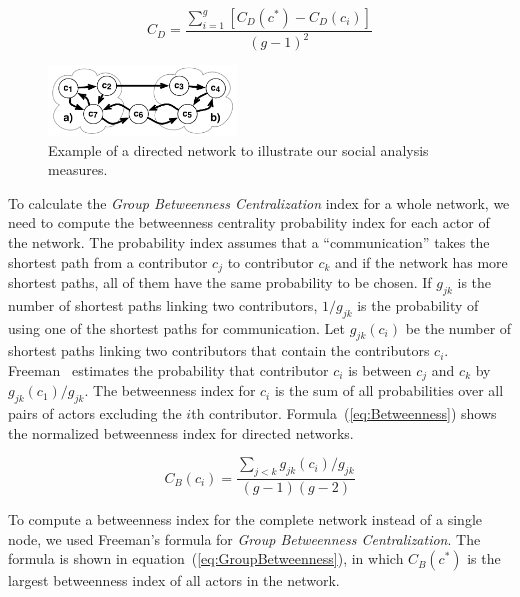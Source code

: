 \documentclass[12pt,oneside]{book}
\begin{document}
\begin{equation}
\displaystyle C_D =  \frac{\sum_{i=1}^g[C_D(c^*) - C_D(c_i)]}{(g-1)^2}
\label{eq:GroupDegreeCentralization}
\end{equation}

\begin{figure}[t]
\begin{center}
\includegraphics[width=5.0cm]{figures/CentralityExample}
\vspace{-10pt}
\caption{Example of a directed network to illustrate our social
analysis measures.}
\label{fig:CentralityExample}
\end{center}
\end{figure}

To calculate the \emph{Group Betweenness Centralization} index for a whole
network, we need to compute the betweenness centrality probability index for each
actor of the network. The probability index assumes that a ``communication''
takes the shortest path from a contributor $c_j$ to contributor $c_k$ and if the
network has more shortest paths, all of them have the same probability to be
chosen. If $g_{jk}$ is the number of shortest paths linking two contributors,
$1/g_{jk}$ is the probability of using one of the shortest paths for
communication. Let $g_{jk}(c_i)$ be the number of shortest paths linking two
contributors that contain the contributors $c_i$. Freeman~\cite{Freeman:1979rl}
estimates the probability that contributor $c_i$ is between $c_j$ and $c_k$ by
$g_{jk}(c_1)/g_{jk}$. The betweenness index for $c_i$ is the sum of all
probabilities over all pairs of actors excluding the $i$th contributor.
Formula~(\ref{eq:Betweenness}) shows the normalized betweenness index for
directed networks.

\begin{equation}
\displaystyle C_B(c_i) =  \frac{\sum_{j<k} g_{jk}(c_i)/g_{jk}}{(g-1)(g-2)}
\label{eq:Betweenness}
\end{equation}

To compute a betweenness index for the complete network instead of a single node,
we used Freeman's formula for \emph{Group Betweenness Centralization}. The
formula is shown in equation~(\ref{eq:GroupBetweenness}), in which $C_B(c^*)$ is
the largest betweenness index of all actors in the network.
\end{document}
